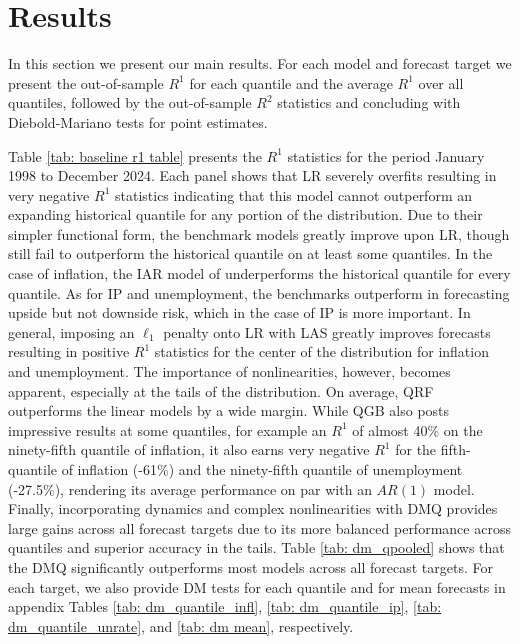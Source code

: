 \documentclass[12pt]{article}
\begin{document}
\section{Results}\label{sec: baseline results}

In this section we present our main results. For each model and forecast target we present the out-of-sample $R^1$ for each quantile and the average $R^1$ over all quantiles, followed by the out-of-sample $R^2$ statistics and concluding with Diebold-Mariano tests for point estimates. 

Table \ref{tab: baseline r1 table} presents the $R^1$ statistics for the period January 1998 to December 2024. Each panel shows that LR severely overfits resulting in very negative $R^1$ statistics indicating that this model cannot outperform an expanding historical quantile for any portion of the distribution. Due to their simpler functional form, the benchmark models greatly improve upon LR, though still fail to outperform the historical quantile on at least some quantiles. In the case of inflation, the IAR model of \cite{lopez-salidoInflationRisk2024} underperforms the historical quantile for every quantile. As for IP and unemployment, the benchmarks outperform in forecasting upside but not downside risk, which in the case of IP is more important. In general, imposing an $\ell_1$ penalty onto LR with LAS greatly improves forecasts resulting in positive $R^1$ statistics for the center of the distribution for inflation and unemployment. The importance of nonlinearities, however, becomes apparent, especially at the tails of the distribution. On average, QRF outperforms the linear models by a wide margin. While QGB also posts impressive results at some quantiles, for example an $R^1$ of almost 40\% on the ninety-fifth quantile of inflation, it also earns very negative $R^1$ for the fifth-quantile of inflation (-61\%) and the ninety-fifth quantile of unemployment (-27.5\%), rendering its average performance on par with an $AR(1)$ model. Finally, incorporating dynamics and complex nonlinearities with DMQ provides large gains across all forecast targets due to its more balanced performance across quantiles and superior accuracy in the tails. Table \ref{tab: dm_qpooled} shows that the DMQ significantly outperforms most models across all forecast targets. For each target, we also provide DM tests for each quantile and for mean forecasts in appendix Tables \ref{tab: dm_quantile_infl}, \ref{tab: dm_quantile_ip}, \ref{tab: dm_quantile_unrate}, and \ref{tab: dm mean}, respectively.
\end{document}
